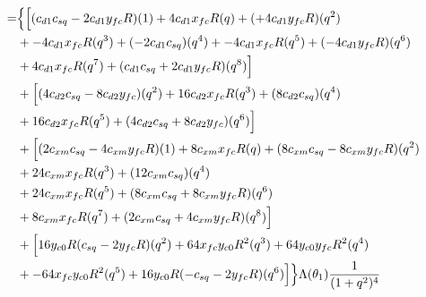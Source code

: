 \documentclass[12pt]{article}
\begin{document}
\begin{align}
    =& \Bigl\{ \Bigl[ (c_{d1}c_{sq} -2c_{d1}y_{fc}R)(1) +4c_{d1}x_{fc}R(q)  +(+4c_{d1}y_{fc}R)(q^2) \nonumber\\
    &+  -4c_{d1}x_{fc}R(q^3)  +(-2c_{d1}c_{sq} )(q^4) + -4c_{d1}x_{fc}R(q^5)  +(-4c_{d1}y_{fc}R)(q^6) \nonumber\\
    &+ 4c_{d1}x_{fc}R(q^7)  +(c_{d1}c_{sq} +2c_{d1}y_{fc}R)(q^8)  \Bigr] \nonumber\\
    &+ \Bigl[ (4c_{d2}c_{sq} -8c_{d2}y_{fc})(q^2) +16c_{d2}x_{fc}R(q^3)  +(8c_{d2}c_{sq} )(q^4) \nonumber\\
    &+ 16c_{d2}x_{fc}R(q^5)  +(4c_{d2}c_{sq} +8c_{d2}y_{fc})(q^6) \Bigr]  \nonumber\\
    &+ \Bigl[ (2c_{xm}c_{sq} -4c_{xm}y_{fc}R )(1) + 8c_{xm}x_{fc}R(q)  +(8c_{xm}c_{sq}- 8c_{xm}y_{fc}R)(q^2) \nonumber\\
    &+  24c_{xm}x_{fc}R(q^3)  +(12c_{xm}c_{sq})(q^4) \nonumber\\
    &+  24c_{xm}x_{fc}R(q^5)  +(8c_{xm}c_{sq}+ 8c_{xm}y_{fc}R)(q^6) \nonumber\\
    &+ 8c_{xm}x_{fc}R(q^7)  +(2c_{xm}c_{sq}+ 4c_{xm}y_{fc}R)(q^8)  \Big] \nonumber \\
    &+ \Bigl[ 16y_{c0}R(c_{sq}-2y_{fc}R)(q^2) +64x_{fc}y_{c0}R^2(q^3)  + 64y_{c0}y_{fc}R^2(q^4) \nonumber\\
    &+ -64x_{fc}y_{c0}R^2(q^5)  + 16y_{c0}R(-c_{sq} - 2y_{fc}R)(q^6) \Big] \Bigr\}\Lambda(\theta_1)\frac{1}{(1+q^2)^4}
\end{align}
\end{document}
